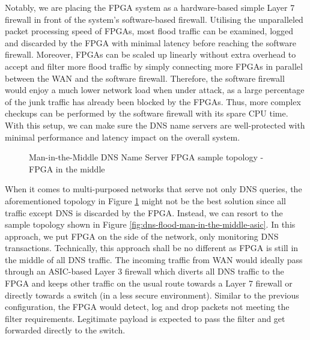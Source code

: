 \documentclass[a4paper]{report}
\begin{document}
Notably, we are placing the FPGA system as a hardware-based simple Layer 7 firewall in front of the system's software-based firewall. Utilising the unparalleled packet processing speed of FPGAs, most flood traffic can be examined, logged and discarded by the FPGA with minimal latency before reaching the software firewall. Moreover, FPGAs can be scaled up linearly without extra overhead to accept and filter more flood traffic by simply connecting more FPGAs in parallel between the WAN and the software firewall. Therefore, the software firewall would enjoy a much lower network load when under attack, as a large percentage of the junk traffic has already been blocked by the FPGAs. Thus, more complex checkups can be performed by the software firewall with its spare CPU time. With this setup, we can make sure the DNS name servers are well-protected with minimal performance and latency impact on the overall system.

\begin{figure}[H]
  \caption{Man-in-the-Middle DNS Name Server FPGA sample topology - FPGA in the middle}
  \label{fig:dns-flood-man-in-the-middle}
\end{figure}

When it comes to multi-purposed networks that serve not only DNS queries, the aforementioned topology in Figure \ref{fig:dns-flood-man-in-the-middle} might not be the best solution since all traffic except DNS is discarded by the FPGA. Instead, we can resort to the sample topology shown in Figure \ref{fig:dns-flood-man-in-the-middle-asic}. In this approach, we put FPGA on the side of the network, only monitoring DNS transactions. Technically, this approach shall be no different as FPGA is still in the middle of all DNS traffic. The incoming traffic from WAN would ideally pass through an ASIC-based Layer 3 firewall which diverts all DNS traffic to the FPGA and keeps other traffic on the usual route towards a Layer 7 firewall or directly towards a switch (in a less secure environment). Similar to the previous configuration, the FPGA would detect, log and drop packets not meeting the filter requirements. Legitimate payload is expected to pass the filter and get forwarded directly to the switch.
\end{document}
